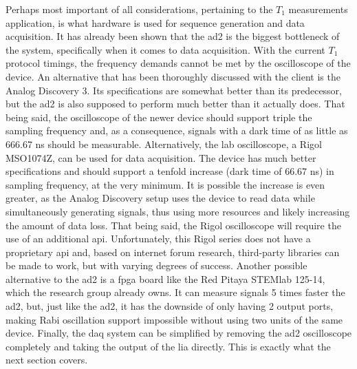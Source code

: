 Perhaps most important of all considerations, pertaining to the $T_1$ measurements application, is what hardware is used for sequence generation and data acquisition. It has already been shown that the \gls{ad2} is the biggest bottleneck of the system, specifically when it comes to data acquisition. With the current $T_1$ protocol timings, the frequency demands cannot be met by the oscilloscope of the device. An alternative that has been thoroughly discussed with the client is the Analog Discovery 3. Its specifications are somewhat better than its predecessor, but the \gls{ad2} is also supposed to perform much better than it actually does. That being said, the oscilloscope of the newer device should support triple the sampling frequency and, as a consequence, signals with a dark time of as little as \num{666,67} \unit{\nano\second} should be measurable. Alternatively, the lab oscilloscope, a Rigol MSO1074Z, can be used for data acquisition. The device has much better specifications and should support a tenfold increase (dark time of \num{66,67} \unit{\nano\second}) in sampling frequency, at the very minimum. It is possible the increase is even greater, as the Analog Discovery setup uses the device to read data while simultaneously generating signals, thus using more resources and likely increasing the amount of data loss. That being said, the Rigol oscilloscope will require the use of an additional \gls{api}. Unfortunately, this Rigol series does not have a proprietary \gls{api} and, based on internet forum research, third-party libraries can be made to work, but with varying degrees of success. Another possible alternative to the \gls{ad2} is a \gls{fpga} board like the Red Pitaya STEMlab 125-14, which the research group already owns. It can measure signals 5 times faster the \gls{ad2}, but, just like the \gls{ad2}, it has the downside of only having 2 output ports, making Rabi oscillation support impossible without using two units of the same device. Finally, the \gls{daq} system can be simplified by removing the \gls{ad2} oscilloscope completely and taking the output of the \gls{lia} directly. This is exactly what the next section covers.



